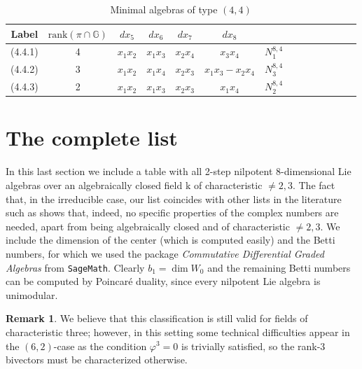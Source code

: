 \documentclass[10pt,reqno]{amsart}
\newcommand{\GG}{\mathbb{G}}
\newcommand{\f}{\varphi}
\newcommand{\kk}{\mathrm{k}}
\theoremstyle{definition}
\newtheorem{remark}[theorem]{Remark}
\begin{document}
\begin{table}[h]
\caption{Minimal algebras of type $(4,4)$}\label{table:4-4}
{\tabulinesep=1mm
\begin{tabu}{|c|c|c|c|c|c|c|c|c|c|c|c|c|c|}
\hline
Label & $\mathrm{rank}(\pi \cap \GG)$ & $dx_5$ & $dx_6$ & $dx_7$ & $dx_8$ & \cite{Yan}\\
\hline
(4.4.1) & 4 & $x_1x_2$ & $x_1x_3$ & $x_2x_4$ & $x_3x_4$ & $N_1^{8,4}$ \\
\hline
(4.4.2) & 3 & $x_1x_2$ & $x_1x_4$ & $x_2x_3$ & $x_1x_3-x_2x_4$ & $N_{3}^{8,4}$\\
\hline
(4.4.3) & 2 & $x_1x_2$ & $x_1x_3$ & $x_2x_3$ & $x_1x_4$ & $N_2^{8,4}$\\
\hline
\end{tabu}}
\end{table}

\section{The complete list}

In this last section we include a table with all 2-step nilpotent 8-dimensional Lie algebras over an algebraically closed field $\kk$ of characteristic $\ne 2,3$. The fact that, in the irreducible case, our list coincides with other lists in the literature such as \cite{Ren2011,Yan} shows that, indeed, no specific properties of the complex numbers are needed, apart from being algebraically closed and of characteristic $\ne 2,3$. We include the dimension of the center (which is computed easily) and the Betti numbers, for which we used the package {\em Commutative Differential Graded Algebras} from \texttt{SageMath}. Clearly $b_1=\dim W_0$ and the remaining Betti numbers can be computed by Poincaré duality, since every nilpotent Lie algebra is unimodular.

\begin{remark}
We believe that this classification is still valid for fields of characteristic three; however, in this setting some technical difficulties appear in the $(6,2)$-case as the condition $\f^3=0$ is trivially satisfied, so the rank-3 bivectors must be characterized otherwise.
\end{remark}
\end{document}
